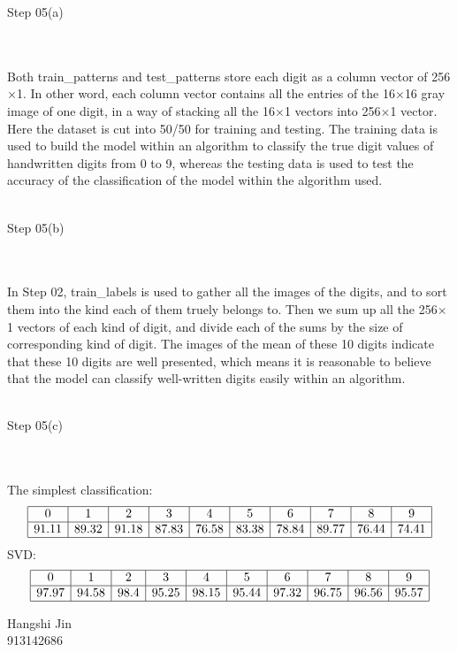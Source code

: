 \documentclass{article}
\begin{document}
\begin{large}Step 05(a)\end{large}
\\\\Both train\_patterns and test\_patterns store each digit as a column vector of 256$\times$1. In other word, each column vector contains all the entries of the 16$\times$16 gray image of one digit, in a way of stacking all the 16$\times$1 vectors into 256$\times$1 vector. Here the dataset is cut into 50/50 for training and testing. The training data is used to build the model within an algorithm to classify the true digit values of handwritten digits from 0 to 9, whereas the testing data is used to test the accuracy of the classification of the model within the algorithm used.
\\\\\begin{large}Step 05(b)\end{large}
\\\\In Step 02, train\_labels is used to gather all the images of the digits, and to sort them into the kind each of them truely belongs to. Then we sum up all the 256$\times$1 vectors of each kind of digit, and divide each of the sums by the size of corresponding kind of digit. The images of the mean of these 10 digits indicate that these 10 digits are well presented, which means it is reasonable to believe that the model can classify well-written digits easily within an algorithm.
\\\\\begin{large}Step 05(c)\end{large}
\\\\The simplest classification:
    \[\begin{array}{|c|c|c|c|c|c|c|c|c|c|} \hline0&1&2&3&4&5&6&7&8&9\\\hline91.11 & 89.32 & 91.18 & 87.83 & 76.58 & 83.38 & 78.84 & 89.77 & 76.44 & 74.41\\\hline \end{array}\]
SVD:\[\begin{array}{|c|c|c|c|c|c|c|c|c|c|}  \hline0&1&2&3&4&5&6&7&8&9\\\hline97.97 & 94.58 & 98.4 & 95.25 & 98.15 & 95.44 & 97.32 & 96.75 & 96.56 & 95.57\\\hline \end{array}\]
\begin{flushright}Hangshi Jin \\913142686\end{flushright}
\end{document}
